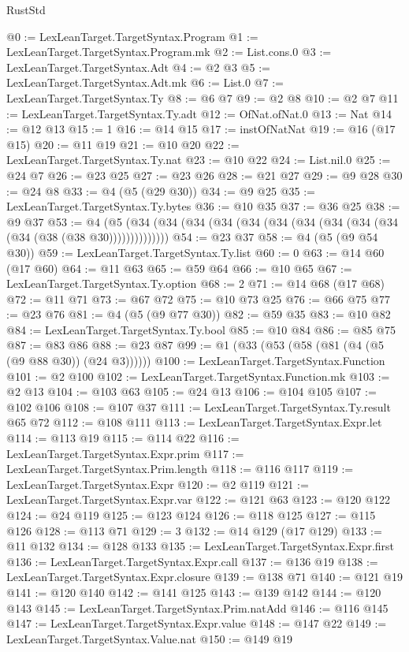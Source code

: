 \begin{lexlean}{RustStd}
\begin{coremodule}
@0 := LexLeanTarget.TargetSyntax.Program
@1 := LexLeanTarget.TargetSyntax.Program.mk
@2 := List.cons.{0}
@3 := LexLeanTarget.TargetSyntax.Adt
@4 := @2 @3
@5 := LexLeanTarget.TargetSyntax.Adt.mk
@6 := List.{0}
@7 := LexLeanTarget.TargetSyntax.Ty
@8 := @6 @7
@9 := @2 @8
@10 := @2 @7
@11 := LexLeanTarget.TargetSyntax.Ty.adt
@12 := OfNat.ofNat.{0}
@13 := Nat
@14 := @12 @13
@15 := 1
@16 := @14 @15
@17 := instOfNatNat
@19 := @16 (@17 @15)
@20 := @11 @19
@21 := @10 @20
@22 := LexLeanTarget.TargetSyntax.Ty.nat
@23 := @10 @22
@24 := List.nil.{0}
@25 := @24 @7
@26 := @23 @25
@27 := @23 @26
@28 := @21 @27
@29 := @9 @28
@30 := @24 @8
@33 := @4 (@5 (@29 @30))
@34 := @9 @25
@35 := LexLeanTarget.TargetSyntax.Ty.bytes
@36 := @10 @35
@37 := @36 @25
@38 := @9 @37
@53 := @4 (@5 (@34 (@34 (@34 (@34 (@34 (@34 (@34 (@34 (@34 (@34 (@34 (@38 (@38 @30))))))))))))))
@54 := @23 @37
@58 := @4 (@5 (@9 @54 @30))
@59 := LexLeanTarget.TargetSyntax.Ty.list
@60 := 0
@63 := @14 @60 (@17 @60)
@64 := @11 @63
@65 := @59 @64
@66 := @10 @65
@67 := LexLeanTarget.TargetSyntax.Ty.option
@68 := 2
@71 := @14 @68 (@17 @68)
@72 := @11 @71
@73 := @67 @72
@75 := @10 @73 @25
@76 := @66 @75
@77 := @23 @76
@81 := @4 (@5 (@9 @77 @30))
@82 := @59 @35
@83 := @10 @82
@84 := LexLeanTarget.TargetSyntax.Ty.bool
@85 := @10 @84
@86 := @85 @75
@87 := @83 @86
@88 := @23 @87
@99 := @1 (@33 (@53 (@58 (@81 (@4 (@5 (@9 @88 @30)) (@24 @3))))))
@100 := LexLeanTarget.TargetSyntax.Function
@101 := @2 @100
@102 := LexLeanTarget.TargetSyntax.Function.mk
@103 := @2 @13
@104 := @103 @63
@105 := @24 @13
@106 := @104 @105
@107 := @102 @106
@108 := @107 @37
@111 := LexLeanTarget.TargetSyntax.Ty.result @65 @72
@112 := @108 @111
@113 := LexLeanTarget.TargetSyntax.Expr.let
@114 := @113 @19
@115 := @114 @22
@116 := LexLeanTarget.TargetSyntax.Expr.prim
@117 := LexLeanTarget.TargetSyntax.Prim.length
@118 := @116 @117
@119 := LexLeanTarget.TargetSyntax.Expr
@120 := @2 @119
@121 := LexLeanTarget.TargetSyntax.Expr.var
@122 := @121 @63
@123 := @120 @122
@124 := @24 @119
@125 := @123 @124
@126 := @118 @125
@127 := @115 @126
@128 := @113 @71
@129 := 3
@132 := @14 @129 (@17 @129)
@133 := @11 @132
@134 := @128 @133
@135 := LexLeanTarget.TargetSyntax.Expr.first
@136 := LexLeanTarget.TargetSyntax.Expr.call
@137 := @136 @19
@138 := LexLeanTarget.TargetSyntax.Expr.closure
@139 := @138 @71
@140 := @121 @19
@141 := @120 @140
@142 := @141 @125
@143 := @139 @142
@144 := @120 @143
@145 := LexLeanTarget.TargetSyntax.Prim.natAdd
@146 := @116 @145
@147 := LexLeanTarget.TargetSyntax.Expr.value
@148 := @147 @22
@149 := LexLeanTarget.TargetSyntax.Value.nat
@150 := @149 @19

\end{coremodule}
\end{lexlean}
